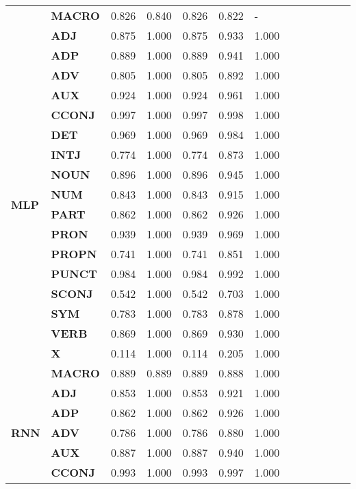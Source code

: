\begin{longtable}{|l||l||l||l||l||l||l||l||l||l||l||l||l|}
\textbf{} & \textbf{MACRO} & 0.826 & 0.840 & 0.826 & 0.822 & - \\
\cline{1-7}
\multirow[t]{18}{*}{\textbf{MLP}} & \textbf{ADJ} & 0.875 & 1.000 & 0.875 & 0.933 & 1.000 \\
\textbf{} & \textbf{ADP} & 0.889 & 1.000 & 0.889 & 0.941 & 1.000 \\
\textbf{} & \textbf{ADV} & 0.805 & 1.000 & 0.805 & 0.892 & 1.000 \\
\textbf{} & \textbf{AUX} & 0.924 & 1.000 & 0.924 & 0.961 & 1.000 \\
\textbf{} & \textbf{CCONJ} & 0.997 & 1.000 & 0.997 & 0.998 & 1.000 \\
\textbf{} & \textbf{DET} & 0.969 & 1.000 & 0.969 & 0.984 & 1.000 \\
\textbf{} & \textbf{INTJ} & 0.774 & 1.000 & 0.774 & 0.873 & 1.000 \\
\textbf{} & \textbf{NOUN} & 0.896 & 1.000 & 0.896 & 0.945 & 1.000 \\
\textbf{} & \textbf{NUM} & 0.843 & 1.000 & 0.843 & 0.915 & 1.000 \\
\textbf{} & \textbf{PART} & 0.862 & 1.000 & 0.862 & 0.926 & 1.000 \\
\textbf{} & \textbf{PRON} & 0.939 & 1.000 & 0.939 & 0.969 & 1.000 \\
\textbf{} & \textbf{PROPN} & 0.741 & 1.000 & 0.741 & 0.851 & 1.000 \\
\textbf{} & \textbf{PUNCT} & 0.984 & 1.000 & 0.984 & 0.992 & 1.000 \\
\textbf{} & \textbf{SCONJ} & 0.542 & 1.000 & 0.542 & 0.703 & 1.000 \\
\textbf{} & \textbf{SYM} & 0.783 & 1.000 & 0.783 & 0.878 & 1.000 \\
\textbf{} & \textbf{VERB} & 0.869 & 1.000 & 0.869 & 0.930 & 1.000 \\
\textbf{} & \textbf{X} & 0.114 & 1.000 & 0.114 & 0.205 & 1.000 \\
\textbf{} & \textbf{MACRO} & 0.889 & 0.889 & 0.889 & 0.888 & 1.000 \\
\cline{1-7}
\multirow[t]{18}{*}{\textbf{RNN}} & \textbf{ADJ} & 0.853 & 1.000 & 0.853 & 0.921 & 1.000 \\
\textbf{} & \textbf{ADP} & 0.862 & 1.000 & 0.862 & 0.926 & 1.000 \\
\textbf{} & \textbf{ADV} & 0.786 & 1.000 & 0.786 & 0.880 & 1.000 \\
\textbf{} & \textbf{AUX} & 0.887 & 1.000 & 0.887 & 0.940 & 1.000 \\
\textbf{} & \textbf{CCONJ} & 0.993 & 1.000 & 0.993 & 0.997 & 1.000 \\

\end{longtable}
